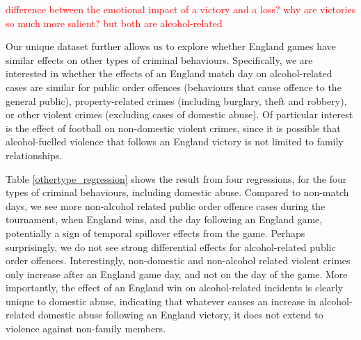\documentclass[12pt, letterpaper]{article}
\begin{document}
\textcolor{red}{difference between the emotional impact of a victory and a loss? why are victories so much more salient? but both are alcohol-related}

Our unique dataset further allows us to explore whether England games have similar effects on other types of criminal behaviours. Specifically, we are interested in whether the effects of an England match day on alcohol-related cases are similar for public order offences (behaviours that cause offence to the general public), property-related crimes (including burglary, theft and robbery), or other violent crimes (excluding cases of domestic abuse).  Of particular interest is the effect of football on non-domestic violent crimes, since it is possible that alcohol-fuelled violence that follows an England victory is not limited to family relationships.

Table \ref{othertype_regression} shows the result from four regressions, for the four types of criminal behaviours, including domestic abuse. Compared to non-match days, we see more non-alcohol related public order offence cases during the tournament, when England wins, and the day following an England game, potentially a sign of temporal spillover effects from the game. Perhaps surprisingly, we do not see strong differential effects for alcohol-related public order offences. Interestingly, non-domestic and non-alcohol related violent crimes only increase after an England game day, and not on the day of the game. More importantly, the effect of an England win on alcohol-related incidents is clearly unique to domestic abuse, indicating that whatever causes an increase in alcohol-related domestic abuse following an England victory, it does not extend to violence against non-family members. 
\end{document}
